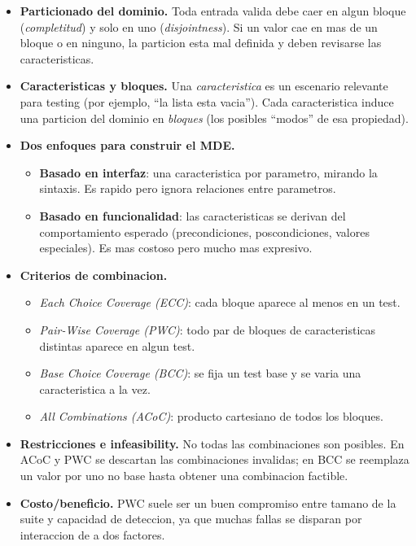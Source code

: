 \documentclass[12pt,a4paper]{article}
\begin{document}
\begin{itemize}
  \item \textbf{Particionado del dominio.} Toda entrada valida debe caer en algun bloque
  (\textit{completitud}) y solo en uno (\textit{disjointness}). Si un valor cae en mas de un
  bloque o en ninguno, la particion esta mal definida y deben revisarse las caracteristicas.

  \item \textbf{Caracteristicas y bloques.} Una \textit{caracteristica} es un escenario relevante
  para testing (por ejemplo, ``la lista esta vacia''). Cada caracteristica induce una particion del
  dominio en \textit{bloques} (los posibles ``modos'' de esa propiedad).

  \item \textbf{Dos enfoques para construir el MDE.}
  \begin{itemize}
    \item \textbf{Basado en interfaz}: una caracteristica por parametro, mirando la sintaxis. Es
    rapido pero ignora relaciones entre parametros.
    \item \textbf{Basado en funcionalidad}: las caracteristicas se derivan del comportamiento
    esperado (precondiciones, poscondiciones, valores especiales). Es mas costoso pero mucho mas
    expresivo.
  \end{itemize}

  \item \textbf{Criterios de combinacion.}
  \begin{itemize}
    \item \textit{Each Choice Coverage (ECC)}: cada bloque aparece al menos en un test.
    \item \textit{Pair-Wise Coverage (PWC)}: todo par de bloques de caracteristicas distintas
    aparece en algun test.
    \item \textit{Base Choice Coverage (BCC)}: se fija un test base y se varia una caracteristica
    a la vez.
    \item \textit{All Combinations (ACoC)}: producto cartesiano de todos los bloques.
  \end{itemize}

  \item \textbf{Restricciones e infeasibility.} No todas las combinaciones son posibles. En ACoC y
  PWC se descartan las combinaciones invalidas; en BCC se reemplaza un valor por uno no base hasta
  obtener una combinacion factible.

  \item \textbf{Costo/beneficio.} PWC suele ser un buen compromiso entre tamano de la suite y
  capacidad de deteccion, ya que muchas fallas se disparan por interaccion de a dos factores.
\end{itemize}
\end{document}
